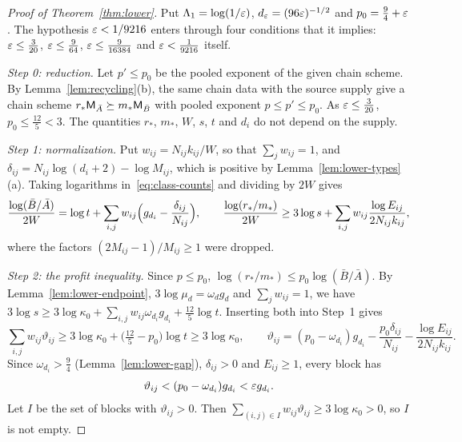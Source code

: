 \begin{proof}[Proof of Theorem~\ref{thm:lower}]
Put \(\Lambda_1=\log(1/\varepsilon)\), \(d_\varepsilon=(96\varepsilon)^{-1/2}\) and
\(p_0=\frac94+\varepsilon\). The hypothesis \(\varepsilon<1/9216\) enters through four
conditions that it implies: \(\varepsilon\le\frac3{20}\), \(\varepsilon\le\frac9{64}\),
\(\varepsilon\le\frac9{16384}\) and \(\varepsilon<\frac1{9216}\) itself.

\emph{Step 0: reduction.} Let \(p'\le p_0\) be the pooled exponent of
the given chain scheme. By Lemma~\ref{lem:recycling}(b), the same chain
data with the source supply give a chain scheme
\(r_*\mathsf M_{\bar A}\succeq m_*\mathsf M_{\bar B}\) with pooled exponent
\(p\le p'\le p_0\). As \(\varepsilon\le\frac3{20}\),
\(p_0\le\frac{12}5<3\). The quantities \(r_*\), \(m_*\), \(W\), \(s\),
\(t\) and \(d_i\) do not depend on the supply.

\emph{Step 1: normalization.} Put \(w_{ij}=N_{ij}k_{ij}/W\), so that
\(\sum_jw_{ij}=1\), and \(\delta_{ij}=N_{ij}\log(d_i+2)-\log M_{ij}\),
which is positive by Lemma~\ref{lem:lower-types}(a). Taking logarithms
in~\eqref{eq:class-counts} and dividing by \(2W\) gives
\[
 \frac{\log(\bar B/\bar A)}{2W}=\log t+\sum_{i,j}w_{ij}\Bigl(g_{d_i}-\frac{\delta_{ij}}{N_{ij}}\Bigr),
 \qquad
 \frac{\log(r_*/m_*)}{2W}\ge3\log s+\sum_{i,j}w_{ij}\frac{\log E_{ij}}{2N_{ij}k_{ij}},
\]
where the factors \((2M_{ij}-1)/M_{ij}\ge1\) were dropped.

\emph{Step 2: the profit inequality.} Since \(p\le p_0\),
\(\log(r_*/m_*)\le p_0\log(\bar B/\bar A)\). By
Lemma~\ref{lem:lower-endpoint}, \(3\log\mu_d=\omega_dg_d\) and
\(\sum_jw_{ij}=1\), we have
\(3\log s\ge3\log\kappa_0+\sum_{i,j}w_{ij}\omega_{d_i}g_{d_i}+\frac{12}5\log t\).
Inserting both into Step~1 gives
\[
 \sum_{i,j}w_{ij}\vartheta_{ij}\ge3\log\kappa_0+\bigl(\tfrac{12}5-p_0\bigr)\log t\ge3\log\kappa_0,
 \qquad
 \vartheta_{ij}=(p_0-\omega_{d_i})g_{d_i}-\frac{p_0\delta_{ij}}{N_{ij}}-\frac{\log E_{ij}}{2N_{ij}k_{ij}} .
\]
Since \(\omega_{d_i}>\frac94\) (Lemma~\ref{lem:lower-gap}),
\(\delta_{ij}>0\) and \(E_{ij}\ge1\), every block has
\begin{equation}\label{eq:lower-theta}
 \vartheta_{ij}<(p_0-\omega_{d_i})g_{d_i}<\varepsilon g_{d_i}.
\end{equation}
Let \(I\) be the set of blocks with \(\vartheta_{ij}>0\). Then
\(\sum_{(i,j)\in I}w_{ij}\vartheta_{ij}\ge3\log\kappa_0>0\), so \(I\) is not
empty.


\end{proof}
